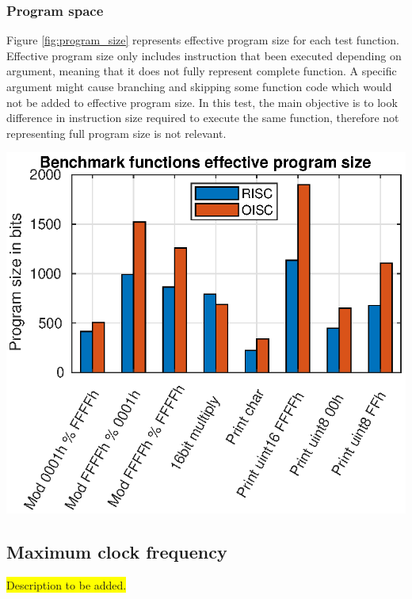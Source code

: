 \subsubsection{Program space}

Figure \ref{fig:program_size} represents effective program size for each test function. Effective program size only includes instruction that been executed depending on argument, meaning that it does not fully represent complete function. A specific argument might cause branching and skipping some function code which would not be added to effective program size. In this test, the main objective is to look difference in instruction size required to execute the same function, therefore not representing full program size is not relevant. 
\begin{colfigure}
	\centering
	\includegraphics[width=\linewidth]{../tests/program_size.eps}
	\label{fig:program_size}
\end{colfigure}

\subsection{Maximum clock frequency}
\colorbox{yellow}{Description to be added.}



